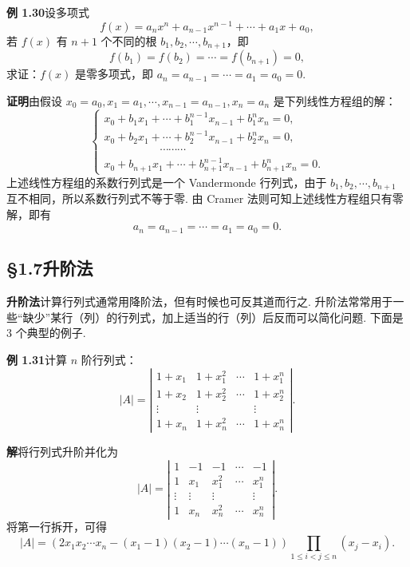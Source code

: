 \documentclass[UTF8, 12pt, fontset=fandol, oneside]{ctexart}
\begin{document}
\noindent\textbf{例 1.30}\quad 设多项式
\[
f(x)=a_nx^n+a_{n-1}x^{n-1}+\cdots+a_1x+a_0,
\]
若 $f(x)$ 有 $n+1$ 个不同的根 $b_1,b_2,\cdots,b_{n+1}$，即
\[
f(b_1)=f(b_2)=\cdots=f(b_{n+1})=0,
\]
求证：$f(x)$ 是零多项式，即 $a_n=a_{n-1}=\cdots=a_1=a_0=0$.

\noindent\textbf{证明}\quad 由假设 $x_0=a_0,x_1=a_1,\cdots,x_{n-1}=a_{n-1},x_n=a_n$ 是下列线性方程组的解：
\[
\left\{\begin{array}{l}
x_0+b_1x_1+\cdots+b_1^{n-1}x_{n-1}+b_1^nx_n=0,\\
x_0+b_2x_1+\cdots+b_2^{n-1}x_{n-1}+b_2^nx_n=0,\\
\hspace{5em}\cdots\cdots\cdots\\
x_0+b_{n+1}x_1+\cdots+b_{n+1}^{n-1}x_{n-1}+b_{n+1}^nx_n=0.
\end{array}\right.
\]
上述线性方程组的系数行列式是一个 Vandermonde 行列式，由于 $b_1,b_2,\cdots,b_{n+1}$ 互不相同，所以系数行列式不等于零. 由 Cramer 法则可知上述线性方程组只有零解，即有
\[
a_n=a_{n-1}=\cdots=a_1=a_0=0.
\]

\subsection*{§1.7\quad 升阶法}

\noindent\textbf{升阶法}\quad 计算行列式通常用降阶法，但有时候也可反其道而行之. 升阶法常常用于一些“缺少”某行（列）的行列式，加上适当的行（列）后反而可以简化问题. 下面是 3 个典型的例子.

\noindent\textbf{例 1.31}\quad 计算 $n$ 阶行列式：
\[
|A|=\left|\begin{array}{cccc}
1+x_1 & 1+x_1^2 & \cdots & 1+x_1^n\\
1+x_2 & 1+x_2^2 & \cdots & 1+x_2^n\\
\vdots & \vdots &        & \vdots\\
1+x_n & 1+x_n^2 & \cdots & 1+x_n^n
\end{array}\right|.
\]

\noindent\textbf{解}\quad 将行列式升阶并化为
\[
|A|=
\left|\begin{array}{ccccc}
1 & -1 & -1 & \cdots & -1\\
1 & x_1 & x_1^2 & \cdots & x_1^n\\
\vdots & \vdots & \vdots &        & \vdots\\
1 & x_n & x_n^2 & \cdots & x_n^n
\end{array}\right|.
\]
将第一行拆开，可得
\[
|A|=\left(2x_1x_2\cdots x_n-(x_1-1)(x_2-1)\cdots(x_n-1)\right)
\prod_{1\le i<j\le n}(x_j-x_i).
\]
\end{document}
